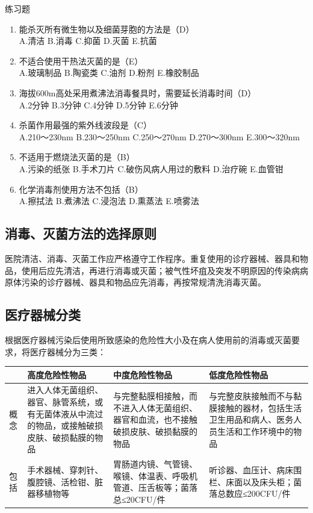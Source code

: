 \documentclass[11pt, a4paper]{ctexart}
\begin{document}
\begin{examplebox}{练习题}
\begin{enumerate}
    \item 能杀灭所有微生物以及细菌芽胞的方法是（D）\\
    A.清洁 \quad B.消毒 \quad C.抑菌 \quad D.灭菌 \quad E.抗菌
    \item 不适合使用干热法灭菌的是（E）\\
    A.玻璃制品 \quad B.陶瓷类 \quad C.油剂 \quad D.粉剂 \quad E.橡胶制品
    \item 海拔600m高处采用煮沸法消毒餐具时，需要延长消毒时间（D）\\
    A.2分钟 \quad B.3分钟 \quad C.4分钟 \quad D.5分钟 \quad E.6分钟
    \item 杀菌作用最强的紫外线波段是（C）\\
    A.210～230nm \quad B.230～250nm \quad C.250～270nm \quad D.270～300nm \quad E.300～320nm
    \item 不适用于燃烧法灭菌的是（B）\\
    A.污染的纸张 \quad B.手术刀片 \quad C.破伤风病人用过的敷料 \quad D.治疗碗 \quad E.血管钳
    \item 化学消毒剂使用方法不包括（B）\\
    A.擦拭法 \quad B.煮沸法 \quad C.浸泡法 \quad D.熏蒸法 \quad E.喷雾法
\end{enumerate}
\end{examplebox}

\subsection{消毒、灭菌方法的选择原则}
医院清洁、消毒、灭菌工作应严格遵守工作程序。重复使用的诊疗器械、器具和物品，使用后应先清洁，再进行消毒或灭菌；被气性坏疽及突发不明原因的传染病病原体污染的诊疗器械、器具和物品应先消毒，再按常规清洗消毒灭菌。

\subsection{医疗器械分类}
根据医疗器械污染后使用所致感染的危险性大小及在病人使用前的消毒或灭菌要求，将医疗器械分为三类：
\begin{table}[htbp]
\centering
\begin{tabular}{|p{3cm}|p{4cm}|p{4cm}|p{4cm}|}
\hline
 & \textbf{高度危险性物品} & \textbf{中度危险性物品} & \textbf{低度危险性物品} \\
\hline
概念 & 进入人体无菌组织、器官、脉管系统，或有无菌体液从中流过的物品，或接触破损皮肤、破损黏膜的物品 & 与完整黏膜相接触，而不进入人体无菌组织、器官和血流，也不接触破损皮肤、破损黏膜的物品 & 与完整皮肤接触而不与黏膜接触的器材，包括生活卫生用品和病人、医务人员生活和工作环境中的物品 \\
\hline
包括 & 手术器械、穿刺针、腹腔镜、活检钳、脏器移植物等 & 胃肠道内镜、气管镜、喉镜、体温表、呼吸机管道、压舌板等；菌落总≤20CFU/件 & 听诊器、血压计、病床围栏、床面以及床头柜；菌落总数应≤200CFU/件 \\
\hline
\end{tabular}
\end{table}
\end{document}
